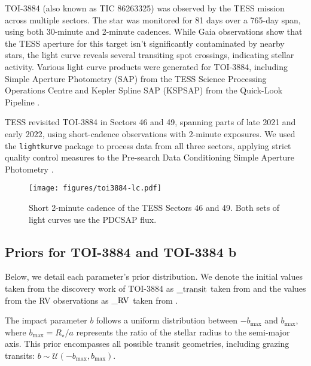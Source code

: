 \documentclass[twocolumn]{aastex631}
\begin{document}
TOI-3884 (also known as TIC 86263325) was observed by the TESS mission across multiple sectors. The star was monitored for 81 days over a 765-day span, 
using both 30-minute and 2-minute cadences. While Gaia observations show that the TESS aperture for this target isn't significantly contaminated by nearby stars, 
the light curve reveals several transiting spot crossings, indicating stellar activity. Various light curve products were generated for TOI-3884, 
including Simple Aperture Photometry (SAP) 
from the TESS Science Processing Operations Centre and Kepler Spline SAP (KSPSAP) from the Quick-Look Pipeline \citep{Huang2020}. 

TESS revisited TOI-3884 in Sectors 46 and 49, spanning parts of late 2021 and early 2022, using short-cadence observations with 2-minute exposures. 
We used the \texttt{lightkurve} package \citep{lightkurve} to process data from all three sectors, applying strict quality control measures to 
the Pre-search Data Conditioning Simple Aperture Photometry \citep{jenkins2016}.

\begin{figure*}[hbt!]
    \begin{centering}
        \texttt{[image: figures/toi3884-lc.pdf]}
        \caption{
            Short 2-minute cadence of the TESS Sectors 46 and 49. 
            Both sets of light curves use the PDCSAP flux.
        }
        \label{fig:toi-3884-pdscap-lc}
    \end{centering}
\end{figure*}

\subsection{Priors for TOI-3884 and TOI-3384 b}

Below, we detail each parameter's prior distribution. We denote the initial values taken from the discovery work of TOI-3884 as 
$\_\rm transit$ taken from \cite{Almenara2022} and the values from the RV observations as $\_\rm RV$ taken from \cite{Libby-Roberts2023}.

The impact parameter $b$ follows a uniform distribution between $-b_{\text{max}}$ and $b_{\text{max}}$, 
where $b_{\text{max}} = R_{\star}/a$ represents the ratio of the stellar radius to the semi-major axis. 
This prior encompasses all possible transit geometries, including grazing transits: $b \sim \mathcal{U}(-b_{\text{max}}, 
b_{\text{max}})$.
\end{document}
